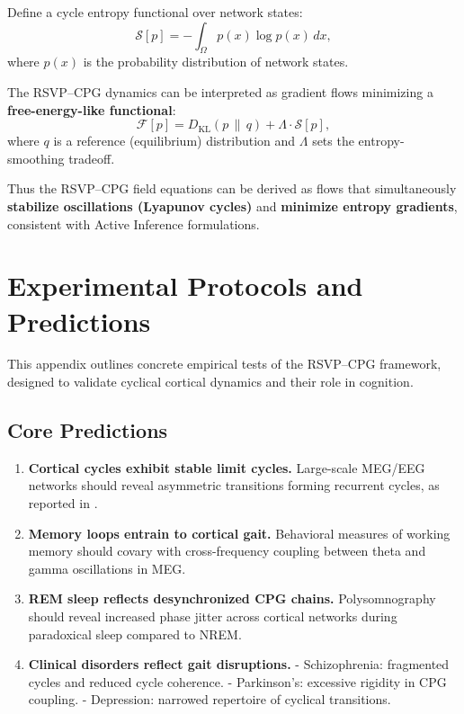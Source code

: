\documentclass{article}
\begin{document}
Define a cycle entropy functional over network states:
\begin{equation}
\mathcal{S}[p] = -\int_\Omega p(x) \log p(x)\, dx,
\end{equation}
where $p(x)$ is the probability distribution of network states. 

The RSVP--CPG dynamics can be interpreted as gradient flows minimizing a 
\textbf{free-energy-like functional}:
\begin{equation}
\mathcal{F}[p] = D_{\mathrm{KL}}(p \,\|\, q) + \Lambda \cdot \mathcal{S}[p],
\end{equation}
where $q$ is a reference (equilibrium) distribution and $\Lambda$ sets the 
entropy-smoothing tradeoff. 

Thus the RSVP--CPG field equations can be derived as flows that simultaneously 
\textbf{stabilize oscillations (Lyapunov cycles)} and \textbf{minimize entropy gradients}, 
consistent with Active Inference formulations.

\section{Experimental Protocols and Predictions}
\label{app:empirical}

This appendix outlines concrete empirical tests of the RSVP--CPG framework, 
designed to validate cyclical cortical dynamics and their role in cognition.  

\subsection{Core Predictions}

\begin{enumerate}
    \item \textbf{Cortical cycles exhibit stable limit cycles.}  
    Large-scale MEG/EEG networks should reveal asymmetric transitions 
    forming recurrent cycles, as reported in \citet{vanes2025}.  

    \item \textbf{Memory loops entrain to cortical gait.}  
    Behavioral measures of working memory should covary with cross-frequency coupling 
    between theta and gamma oscillations in MEG.  

    \item \textbf{REM sleep reflects desynchronized CPG chains.}  
    Polysomnography should reveal increased phase jitter across cortical networks 
    during paradoxical sleep compared to NREM.  

    \item \textbf{Clinical disorders reflect gait disruptions.}  
    - Schizophrenia: fragmented cycles and reduced cycle coherence.  
    - Parkinson’s: excessive rigidity in CPG coupling.  
    - Depression: narrowed repertoire of cyclical transitions.  
\end{enumerate}
\end{document}
